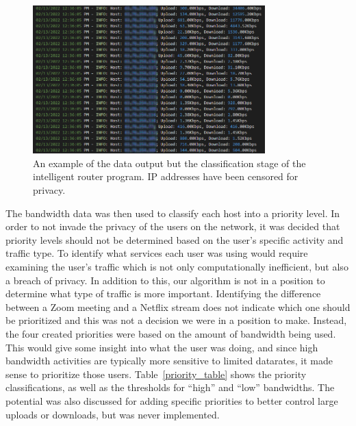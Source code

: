 \begin{figure}[!ht]
    \centering
    \includegraphics[width=0.8\textwidth,keepaspectratio]{Images/Chpt4/LogFile.png}
    \caption{An example of the data output but the classification stage of the intelligent router program. IP addresses have been censored for privacy.}
    \label{log_file}
\end{figure}
The bandwidth data was then used to classify each host into a priority level.
In order to not invade the privacy of the users on the network, it was decided that priority levels should not be determined based on the user's specific activity and traffic type.
To identify what services each user was using would require examining the user's traffic which is not only computationally inefficient, but also a breach of privacy.
In addition to this, our algorithm is not in a position to determine what type of traffic is more important.
Identifying the difference between a Zoom meeting and a Netflix stream does not indicate which one should be prioritized and this was not a decision we were in a position to make.
Instead, the four created priorities were based on the amount of bandwidth being used.
This would give some insight into what the user was doing, and since high bandwidth activities are typically more sensitive to limited datarates, it made sense to prioritize those users.
Table~\ref{priority_table} shows the priority classifications, as well as the thresholds for ``high'' and ``low'' bandwidths.
The potential was also discussed for adding specific priorities to better control large uploads or downloads, but was never implemented.\par
